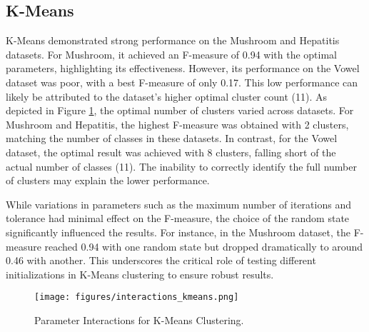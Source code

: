 \subsection{K-Means}
\label{subsec:kmeansresults}

K-Means demonstrated strong performance on the Mushroom and Hepatitis datasets. For Mushroom, it achieved an F-measure of 0.94 with the optimal parameters, highlighting its effectiveness. However, its performance on the Vowel dataset was poor, with a best F-measure of only 0.17. This low performance can likely be attributed to the dataset's higher optimal cluster count (11). As depicted in Figure \ref{fig:interactions-kmeans}, the optimal number of clusters varied across datasets. For Mushroom and Hepatitis, the highest F-measure was obtained with 2 clusters, matching the number of classes in these datasets. In contrast, for the Vowel dataset, the optimal result was achieved with 8 clusters, falling short of the actual number of classes (11). The inability to correctly identify the full number of clusters may explain the lower performance.

While variations in parameters such as the maximum number of iterations and tolerance had minimal effect on the F-measure, the choice of the random state significantly influenced the results. For instance, in the Mushroom dataset, the F-measure reached 0.94 with one random state but dropped dramatically to around 0.46 with another. This underscores the critical role of testing different initializations in K-Means clustering to ensure robust results.

\begin{figure}[h!] \centering \texttt{[image: figures/interactions\_kmeans.png]} \caption{Parameter Interactions for K-Means Clustering.} \label{fig:interactions-kmeans} \end{figure}